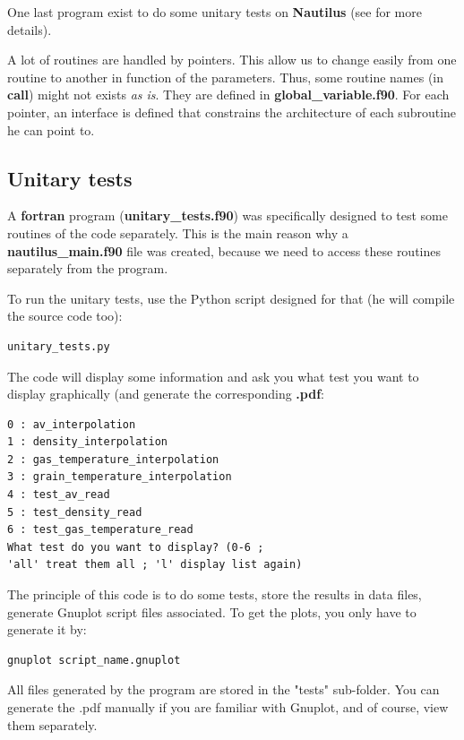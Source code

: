 \documentclass[english,a4paper,twoside]{article}
\begin{document}
One last program exist to do some unitary tests on \textbf{Nautilus} (see  for more details).

A lot of routines are handled by pointers. This allow us to change easily from one routine to another in function of the parameters. Thus, some routine names (in \textbf{call}) might not exists \emph{as is}. They are defined in \textbf{global\_variable.f90}. For each pointer, an interface is defined that constrains the architecture of each subroutine he can point to. 

\subsection{Unitary tests}\label{sec:unitary_tests}
A \textbf{fortran} program  (\textbf{unitary\_tests.f90}) was specifically designed to test some routines of the code separately. This is the main reason why a \textbf{nautilus\_main.f90} file was created, because we need to access these routines separately from the  program.

To run the unitary tests, use the Python script designed for that (he will compile the source code too): 
\begin{verbatim}
unitary_tests.py
\end{verbatim}

The code will display some information and ask you what test you want to display graphically (and generate the corresponding \textbf{.pdf}:
\begin{verbatim}
0 : av_interpolation
1 : density_interpolation
2 : gas_temperature_interpolation
3 : grain_temperature_interpolation
4 : test_av_read
5 : test_density_read
6 : test_gas_temperature_read
What test do you want to display? (0-6 ; 
'all' treat them all ; 'l' display list again)
\end{verbatim}

The principle of this code is to do some tests, store the results in data files, generate Gnuplot script files associated. To get the plots, you only have to generate it by:
\begin{verbatim}
gnuplot script_name.gnuplot
\end{verbatim}

All files generated by the program are stored in the "tests" sub-folder. You can generate the .pdf manually if you are familiar with Gnuplot, and of course, view them separately.
\end{document}
